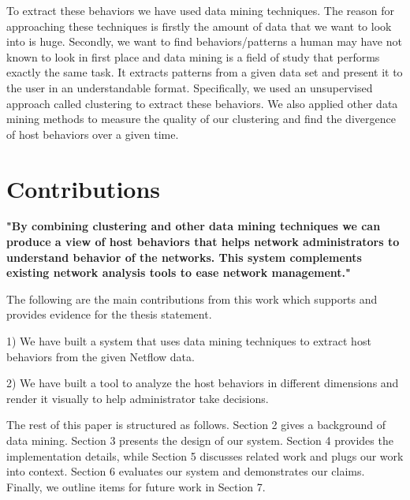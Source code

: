 To extract these behaviors we have used data mining techniques. The reason for approaching these techniques is firstly the amount of data that we want to look into is huge. Secondly, we want to find behaviors/patterns a human may have not known to look in first place and data mining is a field of study that performs exactly the same task. It extracts patterns from a given data set and present it to the user in an understandable format. Specifically, we used an unsupervised approach called clustering to extract these behaviors. We also applied other data mining methods to measure the quality of our clustering and find the divergence of host behaviors over a given time.  


\section{Contributions} \label{contributions}
\textbf{"By combining clustering and other data mining techniques we can produce a view of host behaviors that helps network administrators to understand behavior of the networks. This system complements existing network analysis tools to ease network management."}

The following are the main contributions from this work which supports and provides evidence for the thesis statement.

1) We have built a system that uses data mining techniques to extract host behaviors from the given Netflow data.

2) We have built a tool to analyze the host behaviors in different dimensions and render it visually to help administrator take decisions.

The rest of this paper is structured as follows. Section 2 gives a background of data mining. Section 3 presents the design of our system. Section 4 provides the implementation details, while Section 5 discusses related work and plugs our work into context. Section 6 evaluates our system  and demonstrates our claims. Finally, we outline items for future work in Section 7.
